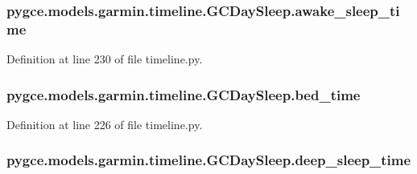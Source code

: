 \subsubsection[{\texorpdfstring{awake\+\_\+sleep\+\_\+time}{awake_sleep_time}}]{\setlength{\rightskip}{0pt plus 5cm}pygce.\+models.\+garmin.\+timeline.\+G\+C\+Day\+Sleep.\+awake\+\_\+sleep\+\_\+time}\hypertarget{classpygce_1_1models_1_1garmin_1_1timeline_1_1_g_c_day_sleep_aefd01be519ebb8192b0887941b66eda0}{}\label{classpygce_1_1models_1_1garmin_1_1timeline_1_1_g_c_day_sleep_aefd01be519ebb8192b0887941b66eda0}


Definition at line 230 of file timeline.\+py.

\subsubsection[{\texorpdfstring{bed\+\_\+time}{bed_time}}]{\setlength{\rightskip}{0pt plus 5cm}pygce.\+models.\+garmin.\+timeline.\+G\+C\+Day\+Sleep.\+bed\+\_\+time}\hypertarget{classpygce_1_1models_1_1garmin_1_1timeline_1_1_g_c_day_sleep_a25002c89e8687bc2a88ea5da386332cd}{}\label{classpygce_1_1models_1_1garmin_1_1timeline_1_1_g_c_day_sleep_a25002c89e8687bc2a88ea5da386332cd}


Definition at line 226 of file timeline.\+py.

\subsubsection[{\texorpdfstring{deep\+\_\+sleep\+\_\+time}{deep_sleep_time}}]{\setlength{\rightskip}{0pt plus 5cm}pygce.\+models.\+garmin.\+timeline.\+G\+C\+Day\+Sleep.\+deep\+\_\+sleep\+\_\+time}\hypertarget{classpygce_1_1models_1_1garmin_1_1timeline_1_1_g_c_day_sleep_a95ebbbd000c531843a8a7fa7f8788f72}{}\label{classpygce_1_1models_1_1garmin_1_1timeline_1_1_g_c_day_sleep_a95ebbbd000c531843a8a7fa7f8788f72}


